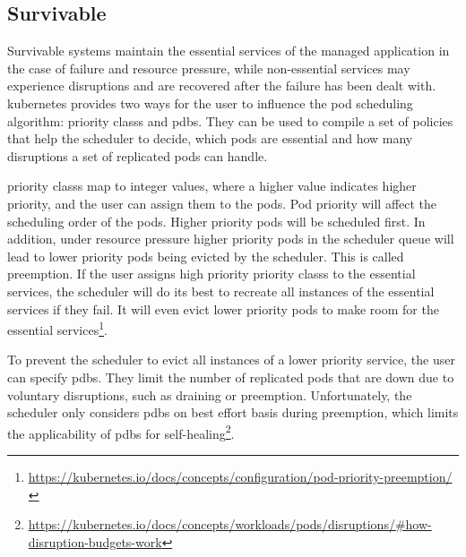 \subsection{Survivable}\label{sec:self-healing-kubernetes:survivable}
  Survivable systems maintain the essential services of the managed application in the case of failure and resource pressure, while non-essential services may experience disruptions and are recovered after the failure has been dealt with.
  \Gls{kubernetes} provides two ways for the user to influence the pod scheduling algorithm: \glspl{priority class} and \glspl{pdb}.
  They can be used to compile a set of policies that help the scheduler to decide, which pods are essential and how many disruptions a set of replicated pods can handle.

  \Glspl{priority class} map to integer values, where a higher value indicates higher priority, and the user can assign them to the pods.
  Pod priority will affect the scheduling order of the pods.
  Higher priority pods will be scheduled first.
  In addition, under resource pressure higher priority pods in the scheduler queue will lead to lower priority pods being evicted by the scheduler.
  This is called preemption.
  If the user assigns high priority \glspl{priority class} to the essential services, the scheduler will do its best to recreate all instances of the essential services if they fail.
  It will even evict lower priority pods to make room for the essential services\footnote{\url{https://kubernetes.io/docs/concepts/configuration/pod-priority-preemption/}}.

  To prevent the scheduler to evict all instances of a lower priority service, the user can specify \glspl{pdb}.
  They limit the number of replicated pods that are down due to voluntary disruptions, such as draining or preemption.
  Unfortunately, the scheduler only considers \glspl{pdb} on best effort basis during preemption, which limits the applicability of \glspl{pdb} for self-healing\footnote{\url{https://kubernetes.io/docs/concepts/workloads/pods/disruptions/\#how-disruption-budgets-work}}.
